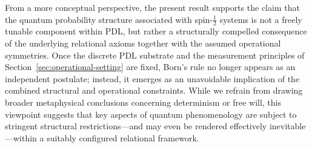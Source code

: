 \documentclass[11pt,a4paper]{article}
\numberwithin{equation}{section}
\theoremstyle{definition}
\begin{document}
From a more conceptual perspective, the present result supports the claim that the quantum probability structure associated with spin-$\tfrac12$ systems is not a freely tunable component within PDL, but rather a structurally compelled consequence of the underlying relational axioms together with the assumed operational symmetries. Once the discrete PDL substrate and the measurement principles of Section~\ref{sec:operational-setting} are fixed, Born’s rule no longer appears as an independent postulate; instead, it emerges as an unavoidable implication of the combined structural and operational constraints. While we refrain from drawing broader metaphysical conclusions concerning determinism or free will, this viewpoint suggests that key aspects of quantum phenomenology are subject to stringent structural restrictions—and may even be rendered effectively inevitable—within a suitably configured relational framework.



\end{document}
